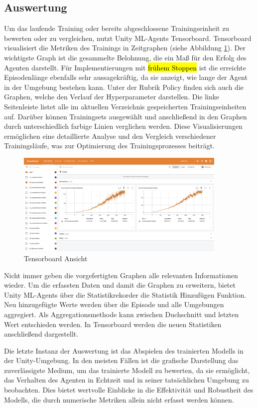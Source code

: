 \subsection{Auswertung}
Um das laufende Training oder bereits abgeschlossene Trainingseinheit zu bewerten oder zu vergleichen, nutzt Unity ML-Agents Tensorboard. Tensorboard visualisiert die Metriken des Trainings in Zeitgraphen (siehe Abbildung \ref{fig:tensorboard}). Der wichtigste Graph ist die gesammelte Belohnung, die ein Maß für den Erfolg des Agenten darstellt. Für Implementierungen mit \hl{frühem Stoppen} ist die erreichte Episodenlänge ebenfalls sehr aussagekräftig, da sie anzeigt, wie lange der Agent in der Umgebung bestehen kann. Unter der Rubrik \grqq{}Policy\grqq{} finden sich auch die Graphen, welche den Verlauf der Hyperparameter darstellen. Die linke Seitenleiste listet alle im aktuellen Verzeichnis gespeicherten Trainingseinheiten auf. Darüber können Trainingsets ausgewählt und anschließend in den Graphen durch unterschiedlich farbige Linien verglichen werden. Diese Visualisierungen ermöglichen eine detaillierte Analyse und den Vergleich verschiedener Trainingsläufe, was zur Optimierung des Trainingsprozesses beiträgt.

\begin{figure}[H]
  \centering  
  \includegraphics[width=0.9\textwidth]{img/tensorboard.png}
  \caption{Tensorboard Ansicht}
  \label{fig:tensorboard}
\end{figure}

Nicht immer geben die vorgefertigten Graphen alle relevanten Informationen wieder. Um die erfassten Daten und damit die Graphen zu erweitern, bietet Unity ML-Agents über die Statistikrekorder die \grqq{}Statistik Hinzufügen\grqq{} Funktion. Neu hinzugefügte Werte werden über die Episode und alle Umgebungen aggregiert. Als Aggregationsmethode kann zwischen Duchschnitt und letzten Wert entschieden werden. In Tensorboard werden die neuen Statistiken anschließend dargestellt.

Die letzte Instanz der Auswertung ist das Abspielen des trainierten Modells in der Unity-Umgebung. In den meisten Fällen ist die grafische Darstellung das zuverlässigste Medium, um das trainierte Modell zu bewerten, da sie ermöglicht, das Verhalten des Agenten in Echtzeit und in seiner tatsächlichen Umgebung zu beobachten. Dies bietet wertvolle Einblicke in die Effektivität und Robustheit des Modells, die durch numerische Metriken allein nicht erfasst werden können.